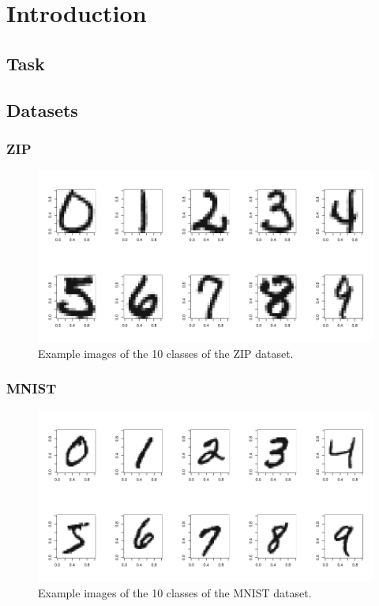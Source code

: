 
\section{Introduction}

\subsection{Task}

\subsection{Datasets}

\subsubsection{ZIP}

\begin{figure}
 \includegraphics[width=\textwidth]{../plots/zip_dataset}
 \caption{Example images of the 10 classes of the ZIP dataset.}
\end{figure}

\subsubsection{MNIST}

\begin{figure}
 \includegraphics[width=\textwidth]{../plots/mnist_dataset}
 \caption{Example images of the 10 classes of the MNIST dataset.}
\end{figure}

